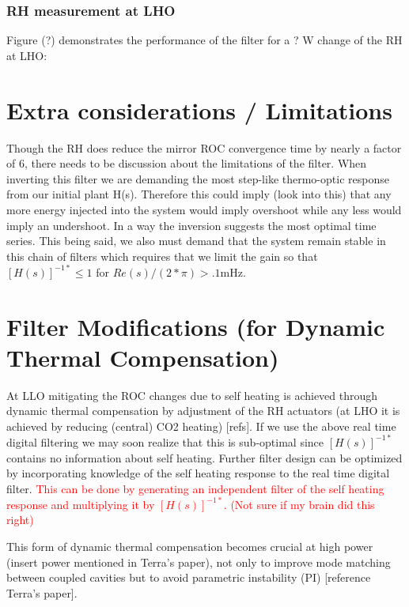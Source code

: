 \documentclass[colorlinks=true,pdfstartview=FitV,linkcolor=blue,
            citecolor=magenta,urlcolor=red]{ligodoc}
\begin{document}
\subsubsection{RH measurement at LHO}
Figure (?) demonstrates the performance of the filter for a ? W change of the RH at LHO:



\section{Extra considerations / Limitations}
Though the RH does reduce the mirror ROC convergence time by nearly a factor of 6, there needs to be discussion about the limitations of the filter. When inverting this filter we are demanding the most step-like thermo-optic response from our initial plant H(s). Therefore this could imply (look into this) that any more energy injected into the system would imply overshoot while any less would imply an undershoot. In a way the inversion suggests the most optimal time series.  This being said, we also must demand that the system remain stable in this chain of filters which requires that we limit the gain so that $[H(s)]^{-1*} \leq 1$ for $Re(s)/(2*\pi)>.1 \mathrm{mHz}$.

\section{Filter Modifications (for Dynamic Thermal Compensation)}
At LLO mitigating the ROC changes due to self heating is achieved through dynamic thermal compensation by adjustment of the RH actuators (at LHO it is achieved by reducing (central) CO2 heating) [refs]. If we use the above real time digital filtering we may soon realize that this is sub-optimal since $[H(s)]^{-1*}$ contains no information about self heating. Further filter design can be optimized by incorporating knowledge of the self heating response to the real time digital filter. \textcolor{red}{This can be done by generating an independent filter of the self heating response and multiplying it by $[H(s)]^{-1*}$. (Not sure if my brain did this right)}

This form of dynamic thermal compensation becomes crucial at high power (insert power mentioned in Terra's paper), not only to improve mode matching between coupled cavities but to avoid parametric instability (PI) [reference Terra's paper].




\begin{thebibliography}{99}


\end{thebibliography}

\newpage
\end{document}
